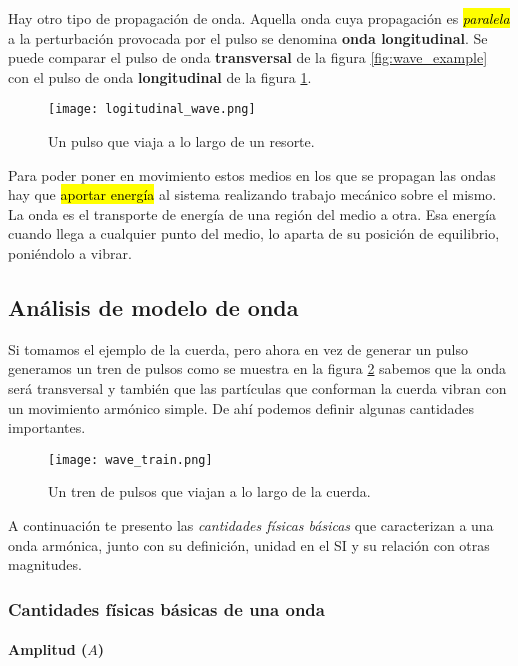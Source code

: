Hay otro tipo de propagación de onda. Aquella onda cuya propagación es \hl{\textit{paralela}} a la perturbación provocada por el pulso se denomina \textbf{onda longitudinal}. Se puede comparar el pulso de onda \textbf{transversal} de la figura \ref{fig:wave_example} con el pulso de onda \textbf{longitudinal} de la figura \ref{fig:longitudinal_wave}.

\begin{figure}[ht]
  \centering
  \texttt{[image: logitudinal\_wave.png]}
  \caption{Un pulso que viaja a lo largo de un resorte.}
  \label{fig:longitudinal_wave}
\end{figure}

Para poder poner en movimiento estos medios en los que se propagan las ondas hay que \hl{aportar energía} al sistema realizando trabajo mecánico sobre el mismo. La onda es el transporte de energía de una región del medio a otra. Esa energía cuando llega a cualquier punto del medio, lo aparta de su posición de equilibrio, poniéndolo a vibrar. 

\subsection{Análisis de modelo de onda}

Si tomamos el ejemplo de la cuerda, pero ahora en vez de generar un pulso generamos un tren de pulsos como se muestra en la figura \ref{fig:wave_train} sabemos que la onda será transversal y también que las partículas que conforman la cuerda vibran con un movimiento armónico simple. De ahí podemos definir algunas cantidades importantes.

\begin{figure}[ht]
  \centering
  \texttt{[image: wave\_train.png]}
  \caption{Un tren de pulsos que viajan a lo largo de la cuerda.}
  \label{fig:wave_train}
\end{figure}

A continuación te presento las \textit{cantidades físicas básicas} que caracterizan a una onda armónica, junto con su definición, unidad en el SI y su relación con otras magnitudes.

\subsubsection{Cantidades físicas básicas de una onda}
\label{sec:waves_basic_quantities}

\paragraph{Amplitud (\(A\))}

